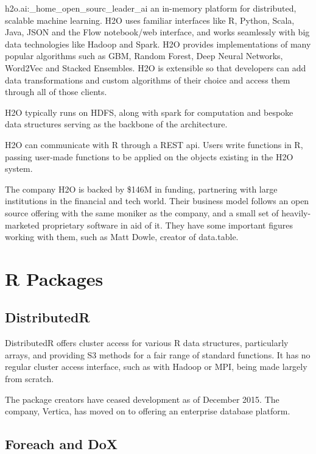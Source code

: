 \documentclass[10pt,a4paper]{article}
\begin{document}
\begin{displaycquote}{h2o.ai:_home_open_sourc_leader_ai}
  an in-memory platform for distributed, scalable machine learning.
  H2O uses familiar interfaces like R, Python, Scala, Java, JSON and
  the Flow notebook/web interface, and works seamlessly with big data
  technologies like Hadoop and Spark. H2O provides implementations of
  many popular algorithms such as GBM, Random Forest, Deep Neural
  Networks, Word2Vec and Stacked Ensembles. H2O is extensible so that
  developers can add data transformations and custom algorithms of
  their choice and access them through all of those clients.
\end{displaycquote}

H2O typically runs on HDFS, along with spark for computation and
bespoke data structures serving as the backbone of the architecture.

H2O can communicate with R through a REST api. Users write functions
in R, passing user-made functions to be applied on the objects
existing in the H2O system\cite{h2o.ai:_h2o}.

The company H2O is backed by \$146M in funding, partnering with large
institutions in the financial and tech world. Their business model
follows an open source offering with the same moniker as the company,
and a small set of heavily-marketed proprietary software in aid of it.
They have some important figures working with them, such as Matt
Dowle, creator of data.table.

\section{R Packages}
\label{sec:r-packages}

\subsection{DistributedR}
\label{sec:distributedr}
DistributedR offers cluster access for various R data structures,
particularly arrays, and providing S3 methods for a fair range of
standard functions. It has no regular cluster access interface, such
as with Hadoop or MPI, being made largely from scratch.

The package creators have ceased development as of December 2015. The
company, Vertica, has moved on to offering an enterprise database
platform\cite{vertica:_distr}.

\subsection{Foreach and DoX}
\label{sec:foreach-dox}
\end{document}
